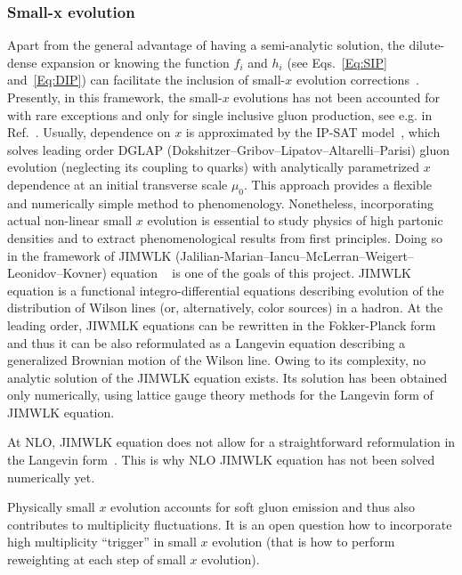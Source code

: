 \subsubsection*{Small-x evolution}
Apart from the general advantage of having a semi-analytic solution, 
the dilute-dense expansion or knowing the function $f_i$ and $h_i$ (see Eqs.~\eqref{Eq:SIP} and~\eqref{Eq:DIP}) 
can facilitate the inclusion of small-$x$ evolution corrections~\cite{Kuraev:1977fs,
Balitsky:1978ic, 
Balitsky:1997mk, 
Balitsky:1998ya, 
Kovchegov:1999yj,
Kovchegov:1999ua, 
JalilianMarian:1997dw, 
JalilianMarian:1997gr,
Iancu:2001ad, 
Iancu:2000hn}.
Presently, in this framework,  the small-$x$ evolutions has not been accounted for 
with rare exceptions and only
for single inclusive gluon production, see e.g. in Ref.~\cite{Dumitru:2018iko}. 
Usually, dependence on $x$ is approximated by the IP-SAT model~\cite{Kowalski:2003hm,Rezaeian:2012ji},
which solves leading order  DGLAP (Dokshitzer--Gribov--Lipatov--Altarelli--Parisi)  gluon evolution (neglecting its coupling to quarks) 
with analytically parametrized $x$ dependence at an initial 
transverse scale $\mu_0$. 
This approach provides a flexible and numerically simple method 
to phenomenology. Nonetheless, incorporating actual non-linear 
small $x$ evolution is essential to study physics 
of high partonic densities and to extract phenomenological results from first principles.  
Doing so in the framework of JIMWLK (Jalilian-Marian--Iancu--McLerran--Weigert--Leonidov--Kovner) equation 
~\cite{JalilianMarian:1997dw, 
JalilianMarian:1997gr,
Iancu:2001ad, 
Iancu:2000hn} 
is one of the goals of this project. 
JIMWLK equation is a functional integro-differential 
equations describing evolution of the distribution of Wilson lines (or, alternatively, color sources) in a 
hadron. At the leading order, JIWMLK equations can be rewritten in the Fokker-Planck form~\cite{Weigert:2000gi}
and thus it can be also reformulated as  a Langevin equation describing a generalized Brownian motion of 
the Wilson line. Owing to its complexity, no analytic solution of the JIMWLK equation exists. 
Its solution has been obtained only numerically, using lattice gauge theory methods for the
 Langevin form of JIMWLK equation.

 At NLO, JIMWLK equation does not allow for a straightforward reformulation in the Langevin form~\cite{Kovner:2014lca}. 
 This is why NLO JIMWLK equation has not been solved numerically yet. 	




Physically small $x$ evolution accounts for soft gluon emission and thus 
also contributes to multiplicity fluctuations. It is an open question how to 
incorporate high multiplicity ``trigger'' in small $x$ evolution (that is how to perform 
reweighting at each step of small $x$ evolution). 

